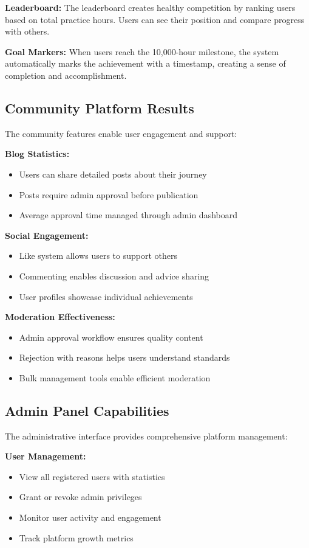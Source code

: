 \documentclass[12pt,a4paper]{report}
\newcommand{\JustifiedNormal}{\fontsize{12}{14}\selectfont\justifying\setlength{\parindent}{0pt}}
\begin{document}
\textbf{Leaderboard:} The leaderboard creates healthy competition by ranking users based on total practice hours. Users can see their position and compare progress with others.

\textbf{Goal Markers:} When users reach the 10,000-hour milestone, the system automatically marks the achievement with a timestamp, creating a sense of completion and accomplishment.

\subsection{Community Platform Results}
\JustifiedNormal
The community features enable user engagement and support:

\textbf{Blog Statistics:}
\begin{itemize}
  \item Users can share detailed posts about their journey
  \item Posts require admin approval before publication
  \item Average approval time managed through admin dashboard
\end{itemize}

\textbf{Social Engagement:}
\begin{itemize}
  \item Like system allows users to support others
  \item Commenting enables discussion and advice sharing
  \item User profiles showcase individual achievements
\end{itemize}

\textbf{Moderation Effectiveness:}
\begin{itemize}
  \item Admin approval workflow ensures quality content
  \item Rejection with reasons helps users understand standards
  \item Bulk management tools enable efficient moderation
\end{itemize}

\subsection{Admin Panel Capabilities}
\JustifiedNormal
The administrative interface provides comprehensive platform management:

\textbf{User Management:}
\begin{itemize}
  \item View all registered users with statistics
  \item Grant or revoke admin privileges
  \item Monitor user activity and engagement
  \item Track platform growth metrics
\end{itemize}
\end{document}
